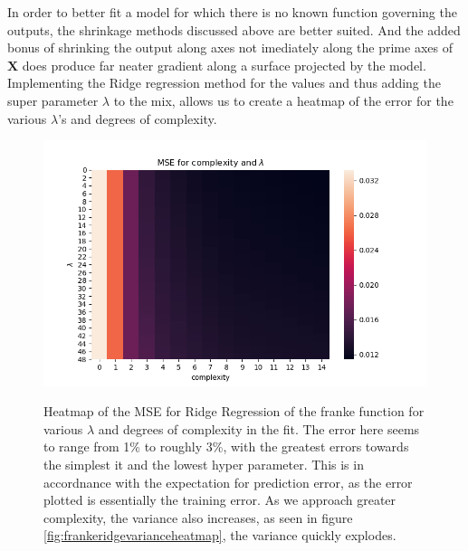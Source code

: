 \documentclass[ 12pt, a4paper ]{article}
\begin{document}
In order to better fit a model for which there is no known function governing the outputs, 
the shrinkage methods discussed above are better suited. And the added bonus of shrinking the
output along axes not imediately along the prime axes of $\mathbf{X}$ does produce far neater 
gradient along a surface projected by the model. Implementing the Ridge regression method for 
the values and thus adding the super parameter $\lambda$ to the mix, allows us to create a 
heatmap of the error for the various $\lambda$'s and degrees of complexity.

\begin{figure}[H]
\includegraphics[scale=0.7]{frankeridgemseheatmap.png}
\label{fig:frankeridgemseheatmap}
\caption{
    Heatmap of the MSE for Ridge Regression of the franke function for various $\lambda$ and 
    degrees of complexity in the fit. The error here seems to range from 1\% to roughly 3\%, 
    with the greatest errors towards the simplest it and the lowest hyper parameter. This is 
    in accordnance with the expectation for prediction error, as the error plotted is essentially
    the training error. As we approach greater complexity, the variance also increases, as seen
    in figure \ref{fig:frankeridgevarianceheatmap}, the variance quickly explodes. 
}
\end{figure}
\end{document}
